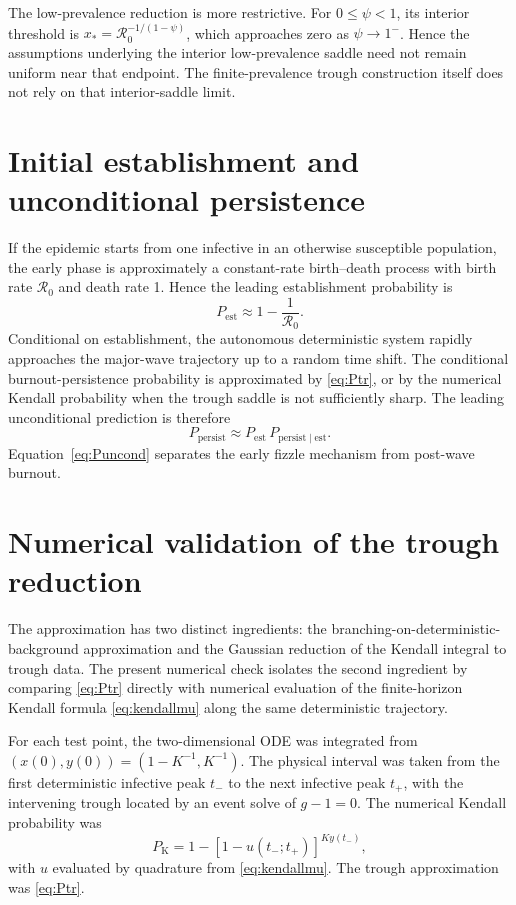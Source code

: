\documentclass[11pt]{article}
\newcommand{\Rzero}{\mathcal R_0}
\newcommand{\PK}{P_{\mathrm K}}
\begin{document}
The low-prevalence reduction is more restrictive. For \(0\le\psi<1\), its interior threshold is \(x_*=\Rzero^{-1/(1-\psi)}\), which approaches zero as \(\psi\to1^-\). Hence the assumptions underlying the interior low-prevalence saddle need not remain uniform near that endpoint. The finite-prevalence trough construction itself does not rely on that interior-saddle limit.

\section{Initial establishment and unconditional persistence}\label{sec:uncond}

If the epidemic starts from one infective in an otherwise susceptible population, the early phase is approximately a constant-rate birth--death process with birth rate \(\Rzero\) and death rate 1. Hence the leading establishment probability is
\begin{equation}
P_{\mathrm{est}}
\approx
1-\frac1{\Rzero}.
\label{eq:Pest}
\end{equation}
Conditional on establishment, the autonomous deterministic system rapidly approaches the major-wave trajectory up to a random time shift. The conditional burnout-persistence probability is approximated by \eqref{eq:Ptr}, or by the numerical Kendall probability when the trough saddle is not sufficiently sharp. The leading unconditional prediction is therefore
\begin{equation}
P_{\mathrm{persist}}
\approx
P_{\mathrm{est}}\,P_{\mathrm{persist}\mid\mathrm{est}}.
\label{eq:Puncond}
\end{equation}
Equation~\eqref{eq:Puncond} separates the early fizzle mechanism from post-wave burnout.

\section{Numerical validation of the trough reduction}

The approximation has two distinct ingredients: the branching-on-deterministic-background approximation and the Gaussian reduction of the Kendall integral to trough data. The present numerical check isolates the second ingredient by comparing \eqref{eq:Ptr} directly with numerical evaluation of the finite-horizon Kendall formula \eqref{eq:kendallmu} along the same deterministic trajectory.

For each test point, the two-dimensional ODE was integrated from \((x(0),y(0))=(1-K^{-1},K^{-1})\). The physical interval was taken from the first deterministic infective peak \(t_-\) to the next infective peak \(t_+\), with the intervening trough located by an event solve of \(g-1=0\). The numerical Kendall probability was
\[
\PK
=1-[1-u(t_-;t_+)]^{Ky(t_-)},
\]
with \(u\) evaluated by quadrature from \eqref{eq:kendallmu}. The trough approximation was \eqref{eq:Ptr}.
\end{document}
